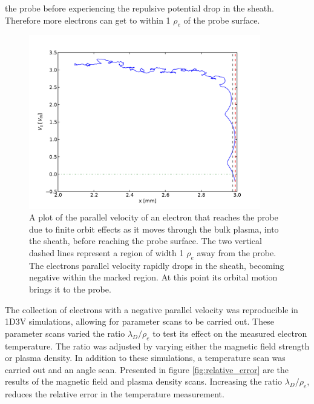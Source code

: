 the probe before experiencing the repulsive potential drop in the sheath. Therefore more electrons can get to within 1 $\rho_e$ of the probe surface. 


\begin{figure}[H]
	\centering
	\includegraphics[width=0.9\textwidth]{absorbed_negative_electron.pdf}
	\caption{A plot of the parallel velocity of an electron that reaches the probe due to finite orbit effects as it moves through the bulk plasma, into the sheath, before reaching the probe surface. The two vertical dashed lines represent a region of width 1 $\rho_e$ away from the probe. The electrons parallel velocity rapidly drops in the sheath, becoming negative within the marked region. At this point its orbital motion brings it to the probe.}
	\label{fig:absorbed_electron}
\end{figure}



The collection of electrons with a negative parallel velocity was reproducible in 1D3V simulations, allowing for parameter scans to be carried out. These parameter scans varied the ratio $\lambda_D / \rho_e$ to test its effect on the measured electron temperature. The ratio was adjusted by varying either the magnetic field strength or plasma density. In addition to these simulations, a temperature scan was carried out and an angle scan. Presented in figure \ref{fig:relative_error} are the results of the magnetic field and plasma density scans. Increasing the ratio $\lambda_D / \rho_e$, reduces the relative error in the temperature measurement. 

